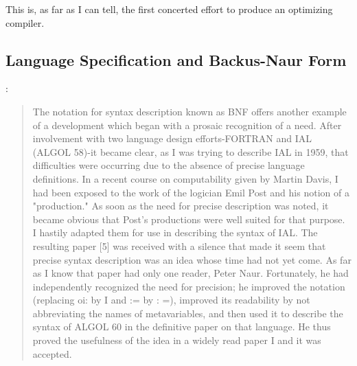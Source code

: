 This is, as far as I can tell, the first concerted effort to produce an
optimizing compiler.

\subsection{Language Specification and Backus-Naur Form}

\cite{Backus_1980_Programming_in_America_in_1950s}:
\begin{quotation}
	The notation for syntax description known as BNF offers another example of a
	development which began with a prosaic recognition of a need.
	After involvement
	with two language design efforts-FORTRAN and IAL (ALGOL 58)-it
	became clear, as
	I was trying to describe IAL in 1959, that difficulties were
	occurring due to
	the absence of precise language definitions. In a recent course on
	computability given by Martin Davis, I had been exposed to the work of the
	logician Emil Post and his notion of a "production." As soon as the need for
	precise description was noted, it became obvious that Post's
	productions were
	well suited for that purpose. I hastily adapted them for use in
	describing the
	syntax of IAL. The resulting paper [5] was received with a
	silence that made it
	seem that precise syntax description was an idea whose time had
	not yet come.
	As far as I know that paper had only one reader, Peter Naur. Fortunately, he
	had independently recognized the need for precision; he improved
	the notation
	(replacing oi: by I and := by : =), improved its readability by not
	abbreviating the names of metavariables, and then used it to describe the
	syntax of ALGOL 60 in the definitive paper on that language. He
	thus proved the
	usefulness of the idea in a widely read paper I and it was accepted.
\end{quotation}


